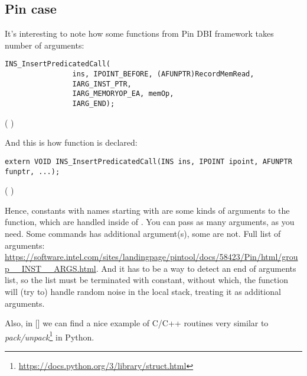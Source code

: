 \subsection{Pin case}

It's interesting to note how some functions from Pin \ac{DBI} framework takes number of arguments:

\begin{lstlisting}[style=customc]
            INS_InsertPredicatedCall(
                ins, IPOINT_BEFORE, (AFUNPTR)RecordMemRead,
                IARG_INST_PTR,
                IARG_MEMORYOP_EA, memOp,
                IARG_END);
\end{lstlisting}
(  )

And this is how  function is declared:

\begin{lstlisting}[style=customc]
extern VOID INS_InsertPredicatedCall(INS ins, IPOINT ipoint, AFUNPTR funptr, ...);
\end{lstlisting}
(  )

Hence, constants with names starting with  are some kinds of arguments to the function,
which are handled inside of .
You can pass as many arguments, as you need.
Some commands has additional argument(s), some are not.
Full list of arguments:
\url{https://software.intel.com/sites/landingpage/pintool/docs/58423/Pin/html/group__INST__ARGS.html}.
And it has to be a way to detect an end of arguments list, so the list must be terminated with  constant,
without which, the function will (try to) handle random noise in the local stack, treating it as additional arguments.

Also, in [\RobPikePractice] we can find a nice example of C/C++ routines very similar to
\emph{pack/unpack}\footnote{\url{https://docs.python.org/3/library/struct.html}} in Python.

